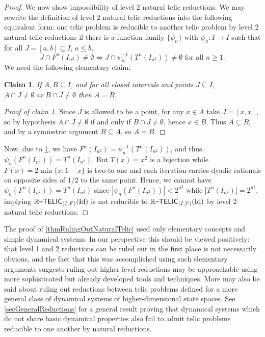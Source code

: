 \documentclass{amsart}
\theoremstyle{theorem}
\newtheorem{claim}[theorem]{Claim}
\theoremstyle{remark}
\DeclareMathOperator{\Id}{Id}
\newcommand{\ccRTELIC}{\mathbb{R}\textsf{\upshape --TELIC}}
\begin{document}
\begin{proof}
We now show impossibility of level 2 natural telic reductions. We may rewrite the definition of level 2 natural telic reductions into the following equivalent form: one telic problem is reducible to another telic problem by level 2 natural telic reductions if there is a function family $\{\psi_n\}$ with $\psi_n:I \rightarrow I$ such that for all $J =[a, b] \subseteq I$, $a\leq b$,
\[
J \cap F^n(I_{n^2}) \neq \emptyset \iff J \cap \psi_n^{-1}(T^n(I_{n^2}))\neq\emptyset \text{ for all } n \geq 1.
\]
We need the following elementary claim.
\begin{claim}\label{claimLvl2}
If $A, B \subseteq I$, and for all closed intervals and points $J \subseteq I$, $A \cap J \neq \emptyset \iff B \cap J \neq \emptyset$ then $A = B$.
\end{claim}
\begin{proof}[Proof of claim \cref{claimLvl2}]
Since $J$ is allowed to be a point, for any $x \in A$ take $J=[x,x]$, so by hypothesis $A \cap J \neq \emptyset$ if and only if $B \cap J \neq \emptyset$, hence $x \in B$. Thus $A \subseteq B$, and by a symmetric argument $B \subseteq A$, so $A=B$.
\end{proof}
Now, due to \cref{claimLvl2}, we have $F^n(I_{n^2}) = \psi_n^{-1}(T^n(I_{n^2}))$, and thus $\psi_n(F^n(I_{n^2})) = T^n(I_{n^2})$. But $T(x) = x^2$ is a bijection while $F(x) = 2\min\{x, 1-x\}$ is two-to-one and each iteration carries dyadic rationals on opposite sides of $1/2$ to the same point. Hence, we cannot have $\psi_n(F^n(I_{n^2})) = T^n(I_{n^2})$ since $|\psi_n(F^n(I_{n^2}))|< 2^{n^2}$ while $|T^n(I_{n^2})| = 2^{n^2}$, implying $\ccRTELIC_{(I,F)}(\Id)$ is not reducible to $\ccRTELIC_{(I, T)}(\Id)$ by level 2 natural telic reductions.
\end{proof}

The proof of \cref{thmRulingOutNaturalTelic} used only elementary concepts and simple dynamical systems. In our perspective this should be viewed positively: that level 1 and 2 reductions can be ruled out in the first place is not necessarily obvious, and the fact that this was accomplished using such elementary arguments suggests ruling out higher level reductions may be approachable using more sophisticated but already developed tools and techniques.
More may also be said about ruling out reductions between telic problems defined for a more general class of dynamical systems of higher-dimensional state spaces. See \cref{secGeneralReductions} for a general result proving that dynamical systems which do not share basic dynamical properties also fail to admit telic problems reducible to one another by natural reductions.
\end{document}
